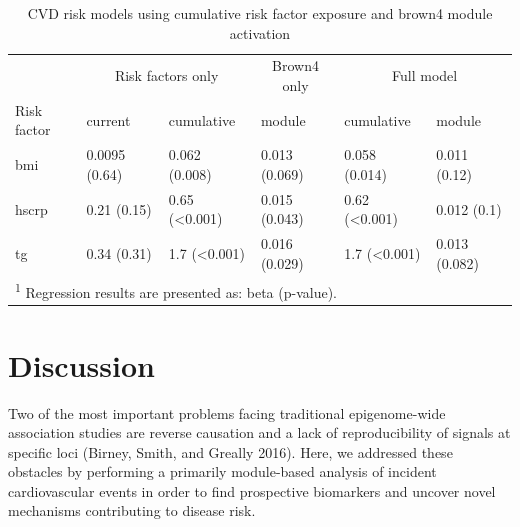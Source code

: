 \documentclass[]{article}
\theoremstyle{definition}
\theoremstyle{definition}
\theoremstyle{definition}
\theoremstyle{remark}
\begin{document}
\begin{table}

\caption{\label{tab:module-mediation}CVD risk models using cumulative risk factor exposure and brown4 module activation}
\centering
\begin{tabular}[t]{llllll}
\toprule
\multicolumn{1}{c}{} & \multicolumn{2}{c}{Risk factors only} & \multicolumn{1}{c}{Brown4 only} & \multicolumn{2}{c}{Full model} \\
\cmidrule(l{2pt}r{2pt}){2-3} \cmidrule(l{2pt}r{2pt}){4-4} \cmidrule(l{2pt}r{2pt}){5-6}
Risk factor & current & cumulative & module & cumulative & module\\
\midrule
bmi & 0.0095 (0.64) & 0.062 (0.008) & 0.013 (0.069) & 0.058 (0.014) & 0.011 (0.12)\\
hscrp & 0.21 (0.15) & 0.65 (<0.001) & 0.015 (0.043) & 0.62 (<0.001) & 0.012 (0.1)\\
tg & 0.34 (0.31) & 1.7 (<0.001) & 0.016 (0.029) & 1.7 (<0.001) & 0.013 (0.082)\\
\bottomrule
\multicolumn{6}{l}{\textsuperscript{1} Regression results are presented as: beta (p-value).}\\
\end{tabular}
\end{table}

\section{Discussion}\label{discussion}

Two of the most important problems facing traditional epigenome-wide
association studies are reverse causation and a lack of reproducibility
of signals at specific loci (Birney, Smith, and Greally 2016). Here, we
addressed these obstacles by performing a primarily module-based
analysis of incident cardiovascular events in order to find prospective
biomarkers and uncover novel mechanisms contributing to disease risk.
\end{document}
